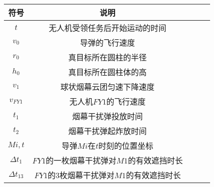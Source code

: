 \documentclass[../main.tex]{subfiles}
\begin{document}




\begin{table}[H]
\centering
\tabcolsep=1cm%
\begin{tabular}{ccccc}
\toprule[1.5pt]
符号 & 说明  \\ 
\midrule[1pt]
$t$              & 无人机受领任务后开始运动的时间            \\
$ v_0 $          & 导弹的飞行速度                          \\
$r_0$            &真目标所在圆柱的半径                      \\
$h_0$            &真目标所在圆柱体的高                      \\
$v_1$            &球状烟幕云团匀速下降速度                   \\
$v_{FY1}$        &无人机\( FY1 \)的飞行速度                 \\
$t_1$            &烟幕干扰弹投放时间                        \\
$t_2$            &烟幕干扰弹起炸放时间                      \\
$Mi,t$           &导弹$Mi$在$t$时刻的位置坐标               \\
$\varDelta t_1$  &\( FY1 \)的一枚烟幕干扰弹对$M1$的有效遮挡时长             \\
$\Delta t_{13}$  &\( FY1 \)的3枚烟幕干扰弹对$M1$的有效遮挡时长       
\\     
\bottomrule[1.5pt]
\end{tabular}
\end{table}
\end{document}
